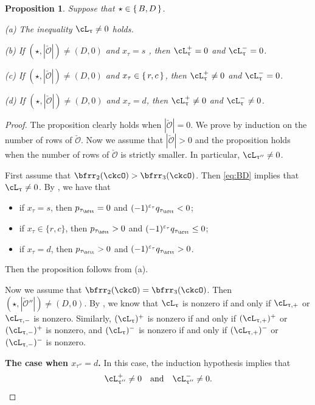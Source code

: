 \documentclass[11pt,a4paper]{amsart}
\def\abs#1{\left|{#1}\right|}
\newcommand{\CO}{{\mathcal {O}}}
\numberwithin{equation}{section}
\newtheorem{prop}[thm]{Proposition}
\theoremstyle{remark}
\def\ac{\cL}
\begin{document}
  \begin{prop}\label{lem:BD204}
Suppose that $\star \in \set{B,D}$. 

\noindent (a) The inequality $\ac_{\uptau} \neq 0$ holds. 

\noindent (b)  If $(\star, \abs{\check \CO})\neq (D, 0)$ and $x_{\tau}=s$ , then $\ac_{\uptau}^{+} =0$ and $\ac_{\uptau}^{-}=0$.

\noindent (c) If $(\star, \abs{\check \CO})\neq (D, 0)$ and $x_{\tau}\in \set{r,c}$, then $\ac_{\uptau}^{+} \neq 0$ and $\ac_{\uptau}^{-}=0$.

\noindent (d) If $(\star, \abs{\check \CO})\neq (D, 0)$ and $x_{\tau}=d$, then $\ac_{\uptau}^{+} \neq 0$ and
  $\ac_{\uptau}^{-}\neq 0$.

\end{prop}
\begin{proof}
The proposition clearly holds when $\abs{\check \CO}=0$. We prove by induction on the number of rows of $\check \CO$. Now we assume that $\abs{\check \CO}>0$ and the proposition holds when the number of rows of $\check \CO$ is strictly smaller. In particular, $\ac_{\uptau''}\neq 0$. 

First assume that $\bfrr_{2}(\ckcO)>\bfrr_{3}(\ckcO)$. Then \eqref{eq:BD} implies that $\ac_\uptau\neq 0$. By , we have that 
\begin{itemize}
    \item if $x_\tau=s$, then $p_{\tau_\bftt}=0$ and $(-1)^{\varepsilon_\tau} q_{\tau_\bftt}<0$;
      \item 
      if $x_\tau\in \{r,c\}$, then $p_{\tau_\bftt}>0$ and $(-1)^{\varepsilon_\tau} q_{\tau_\bftt}\leq 0$;
      \item 
      if $x_\tau=d$, then $p_{\tau_\bftt}>0$ and $(-1)^{\varepsilon_\tau} q_{\tau_\bftt}> 0$.
\end{itemize}
 Then the proposition follows from  (a).
      
Now we assume that $\bfrr_{2}(\ckcO)=\bfrr_{3}(\ckcO)$. Then $(\star, \abs{\check \CO''})\neq (D,0)$. By , we know that $\ac_\uptau $ is nonzero  if and only if $\ac_{\uptau,+}$ or $\ac_{\uptau,-}$ is nonzero. Similarly, $(\ac_\uptau)^+ $ is nonzero  if and only if $(\ac_{\uptau,+})^+$ or $(\ac_{\uptau,-})^+$ is nonzero, and $(\ac_\uptau)^- $ is nonzero  if and only if $(\ac_{\uptau,+})^-$ or $(\ac_{\uptau,-})^-$ is nonzero.

{\bf The case when  $x_{\tau''}=d$.} In this case,  the induction hypothesis implies that \[
\ac_{\uptau''}^+\neq 0\quad\textrm{and} \quad \ac_{\uptau''}^-\neq 0.
\]


\end{proof}
\end{document}
